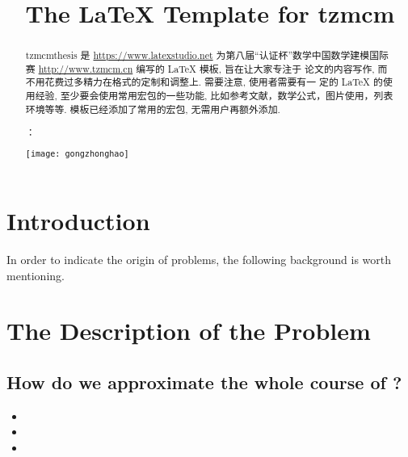 \documentclass{tzmcmthesis}
\title{The \LaTeX{} Template for tzmcm} %
\begin{document}
 \maketitle
 \begin{abstract}
tzmcmthesis 是 \url{https://www.latexstudio.net} 为第八届“认证杯”数学中国数学建模国际赛 \url{http://www.tzmcm.cn} 编写的 \LaTeX{} 模板, 旨在让大家专注于 论文的内容写作, 而不用花费过多精力在格式的定制和调整上.
需要注意, 使用者需要有一 定的 \LaTeX{} 的使用经验, 至少要会使用常用宏包的一些功能, 比如参考文献，数学公式，图片使用，列表环境等等.  模板已经添加了常用的宏包, 无需用户再额外添加.

：

\centerline{\texttt{[image: gongzhonghao]}}

\end{abstract}



\newpage
\tableofcontents


\newpage

\section{Introduction}
In order to indicate the origin of       problems, the following background is worth mentioning.
\subsection{}


\subsection{}



\subsection{}


\section{The Description of the Problem}
\subsection{How do we approximate the whole course of ?}

\begin{itemize}
  \item
  \item
  \item
\end{itemize}
\end{document}
